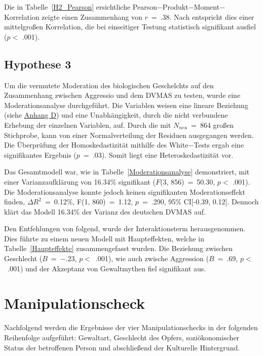 Die in Tabelle~\ref{H2_Pearson} ersichtliche Pearson$-$Produkt$-$Moment$-$Korrelation zeigte einen Zusammenhang von $r$~=~.38. Nach \textcite{Cohen_1992} entspricht dies einer mittelgroßen Korrelation, die bei einseitiger Testung statistisch signifikant ausfiel ($p<$ .001).



\subsection{Hypothese 3}    \label{subsec_4.2.3}
Um die vermutete Moderation des biologischen Geschelchts auf den Zusammenhang zwischen Aggressio und dem DVMAS zu testen, wurde eine Moderationsanalyse durchgeführt. Die Variablen weisen eine lineare Beziehung (siehe \hyperref[Linearitat_sex_DVMAS]{Anhang D}) und eine Unabhängigkeit, durch die nicht verbundene Erhebung der einzelnen Variablen, auf. Durch die mit $N_{neu}$~=~864 großen Stichprobe, kann von einer Normalverteilung der Residuen ausgegangen werden. Die Überprüfung der Homoskedastizität mithilfe des White$-$Tests ergab eine signifikantes Ergebnis ($p$~=~.03). Somit liegt eine Heteroskedastizität vor. 


Das Gesamtmodell war, wie in Tabelle~\ref{Moderationsanalyse} demonstriert, mit einer Varianzaufklärung von 16.34\% signifikant ($F$(3, 856)~=~50.30, $p<$ .001). Die Moderationsanalyse konnte jedoch keinen signifikanten Moderationseffekt finden, $\Delta R^{2}$~=~0.12\%, F(1, 860)~=~1.12, $p$~=~.290, 95\% CI[-0.39, 0.12]. Dennoch klärt das Modell 16.34\% der Varianz des deutschen DVMAS auf.


Den Entfehlungen von \textcite{Moderation_SPSS} folgend, wurde der Interaktionsterm herausgenommen. Dies führte zu einem neuen Modell mit Haupteffekten, welche in Tabelle~\ref{Haupteffekte} zusammengefasst wurden. Die Beziehung zwischen Geschlecht ($B$~=~$-$.23, $p<$~.001), wie auch zwische Aggression ($B$~=~.69, $p<$~.001) und der Akzeptanz von Gewaltmythen fiel signifikant aus. 


\section{Manipulationscheck}    \label{sec_4.3}
Nachfolgend werden die Ergebnisse der vier Manipulationschecks in der folgenden Reihenfolge aufgeführt: Gewaltart, Geschlecht des Opfers, soziökonomischer Status der betroffenen Person und abschließend der Kulturelle Hintergrund.



